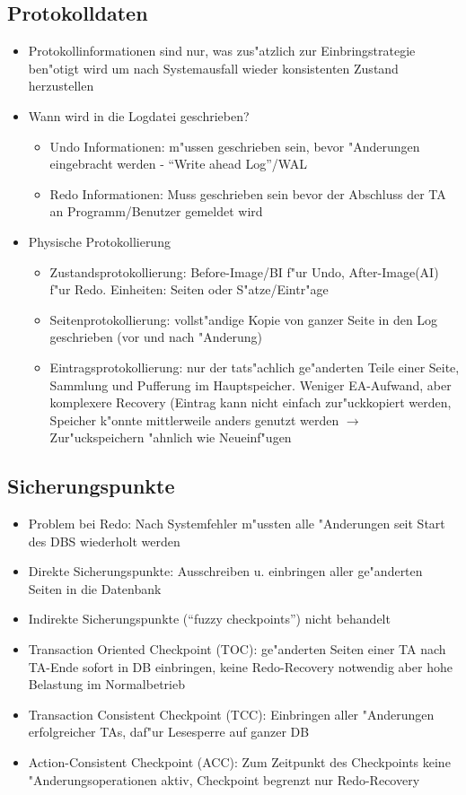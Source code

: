 \documentclass[a4paper, 12pt]{scrartcl}
\begin{document}
\subsection{Protokolldaten}
\begin{itemize}
	\item
		Protokollinformationen sind nur, was zus"atzlich zur Einbringstrategie ben"otigt wird um nach Systemausfall wieder konsistenten Zustand herzustellen
	\item
		Wann wird in die Logdatei geschrieben?
		\begin{itemize}
			\item
				Undo Informationen: m"ussen geschrieben sein, bevor "Anderungen eingebracht werden - \enquote{Write ahead Log}/WAL
			\item
				Redo Informationen: Muss geschrieben sein bevor der Abschluss der TA an Programm/Benutzer gemeldet wird
		\end{itemize}

	\item
		Physische Protokollierung
		\begin{itemize}
			\item
				Zustandsprotokollierung: Before-Image/BI f"ur Undo, After-Image(AI) f"ur Redo. Einheiten: Seiten oder S"atze/Eintr"age
			\item
				Seitenprotokollierung: vollst"andige Kopie von ganzer Seite in den Log geschrieben (vor und nach "Anderung)
			\item
				Eintragsprotokollierung: nur der tats"achlich ge"anderten Teile einer Seite, Sammlung und Pufferung im Hauptspeicher. Weniger EA-Aufwand, aber komplexere Recovery (Eintrag kann nicht einfach zur"uckkopiert werden, Speicher k"onnte mittlerweile anders genutzt werden  $\rightarrow$ Zur"uckspeichern "ahnlich wie Neueinf"ugen

		\end{itemize}

\end{itemize}
\subsection{Sicherungspunkte}
\begin{itemize}
	\item
		Problem bei Redo: Nach Systemfehler m"ussten alle "Anderungen seit Start des DBS wiederholt werden
	\item
		Direkte Sicherungspunkte: Ausschreiben u. einbringen aller ge"anderten Seiten in die Datenbank
	\item
		Indirekte Sicherungspunkte (\enquote{fuzzy checkpoints}) nicht behandelt
	\item
		Transaction Oriented Checkpoint (TOC): ge"anderten Seiten einer TA nach TA-Ende sofort in DB einbringen, keine Redo-Recovery notwendig aber hohe Belastung im Normalbetrieb
	\item
		Transaction Consistent Checkpoint (TCC): Einbringen aller "Anderungen erfolgreicher TAs, daf"ur Lesesperre auf ganzer DB
	\item
		Action-Consistent Checkpoint (ACC): Zum Zeitpunkt des Checkpoints keine "Anderungsoperationen aktiv, Checkpoint begrenzt nur Redo-Recovery
\end{itemize}
\end{document}
